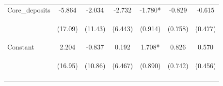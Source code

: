 \documentclass[]{article}
\begin{document}
\begin{center}
\begin{tabular}{lcccccc}
Core\_deposits & -5.864 & -2.034 & -2.732 & -1.780* & -0.829 & -0.615 \\
\vspace{4pt} & \begin{footnotesize}(17.09)\end{footnotesize} & \begin{footnotesize}(11.43)\end{footnotesize} & \begin{footnotesize}(6.443)\end{footnotesize} & \begin{footnotesize}(0.914)\end{footnotesize} & \begin{footnotesize}(0.758)\end{footnotesize} & \begin{footnotesize}(0.477)\end{footnotesize} \\
Constant & 2.204 & -0.837 & 0.192 & 1.708* & 0.826 & 0.570 \\
 & \begin{footnotesize}(16.95)\end{footnotesize} & \begin{footnotesize}(10.86)\end{footnotesize} & \begin{footnotesize}(6.467)\end{footnotesize} & \begin{footnotesize}(0.890)\end{footnotesize} & \begin{footnotesize}(0.742)\end{footnotesize} & \begin{footnotesize}(0.456)\end{footnotesize} \\
\vspace{4pt} & \begin{footnotesize}\end{footnotesize} & \begin{footnotesize}\end{footnotesize} & \begin{footnotesize}\end{footnotesize} & \begin{footnotesize}\end{footnotesize} & \begin{footnotesize}\end{footnotesize} & \begin{footnotesize}\end{footnotesize} \\

\end{tabular}
\end{center}
\end{document}
